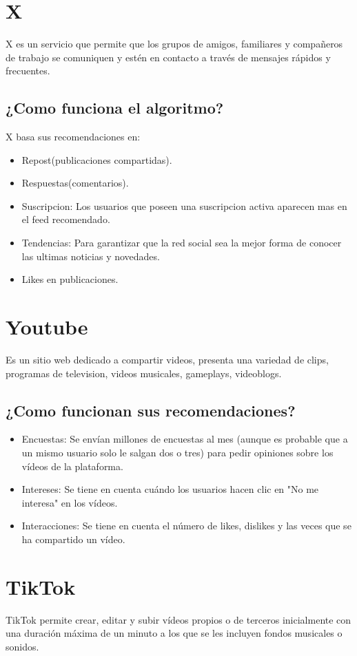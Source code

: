 \section{{\textbf{X}}}
X es un servicio que permite que los grupos de amigos, familiares y compañeros de trabajo se comuniquen y estén en contacto a través de mensajes rápidos y frecuentes.
\subsection*{¿Como funciona el algoritmo?}
X basa sus recomendaciones en:
\begin{itemize}
    \item Repost(publicaciones compartidas).
    \item Respuestas(comentarios).
    \item Suscripcion:
        Los usuarios que poseen una suscripcion activa aparecen mas en el feed recomendado.
    \item Tendencias:
        Para garantizar que la red social sea la mejor forma de conocer las ultimas noticias y novedades.
    \item Likes en publicaciones.
\end{itemize}

\section{{\textbf{Youtube}}}
Es un sitio web dedicado a compartir videos, presenta una variedad de clips, programas de television, videos musicales, gameplays, videoblogs.
\subsection*{¿Como funcionan sus recomendaciones?}
\begin{itemize}
    \item Encuestas:
    Se envían millones de encuestas al mes (aunque es probable que a un mismo usuario solo le salgan dos o tres) para pedir opiniones sobre los vídeos de la plataforma.
    \item Intereses:
    Se tiene en cuenta cuándo los usuarios hacen clic en "No me interesa" en los vídeos.
    \item Interacciones:
    Se tiene en cuenta el número de likes, dislikes y las veces que se ha compartido un vídeo.
\end{itemize}

\section{{\textbf{TikTok}}}
TikTok permite crear, editar y subir vídeos propios o de terceros inicialmente con una duración máxima de un minuto a los que se les incluyen fondos musicales o sonidos.
